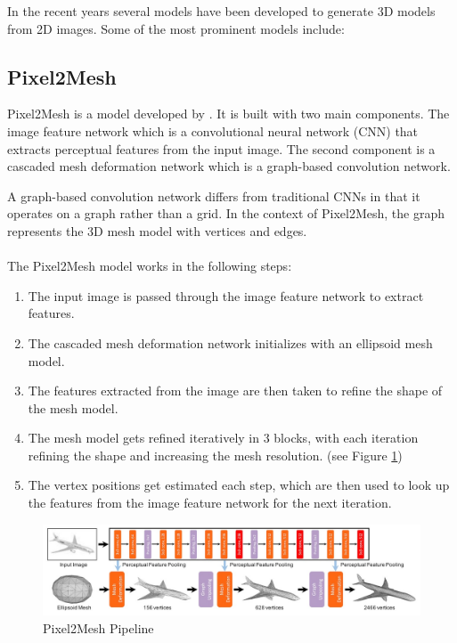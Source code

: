 In the recent years several models have been developed to generate 3D models from 2D images. Some of the most prominent models include:

\subsection{Pixel2Mesh}
Pixel2Mesh is a model developed by \textcite{wang_pixel2mesh_2018}.
It is built with two main components. The image feature network which is a convolutional neural network (CNN) that extracts perceptual features from the input image. The second component is a cascaded mesh deformation network which is a graph-based convolution network.

A graph-based convolution network differs from traditional CNNs in that it operates on a graph rather than a grid. In the context of Pixel2Mesh, the graph represents the 3D mesh model with vertices and edges.

\paragraph{}
The Pixel2Mesh model works in the following steps:
\begin{enumerate}
    \item The input image is passed through the image feature network to extract features.
    \item The cascaded mesh deformation network initializes with an ellipsoid mesh model.
    \item The features extracted from the image are then taken to refine the shape of the mesh model.
    \item The mesh model gets refined iteratively in 3 blocks, with each iteration refining the shape and increasing the mesh resolution. (see Figure \ref{fig:pixel2mesh})
    \item The vertex positions get estimated each step, which are then used to look up the features from the image feature network for the next iteration.
\end{enumerate}
\begin{figure}
    \centering
    \includegraphics[width=1\linewidth]{images/pixel2mesh.jpg}
    \caption{Pixel2Mesh Pipeline \autocite{horn_shape_1989}}
    \label{fig:pixel2mesh}
\end{figure}

